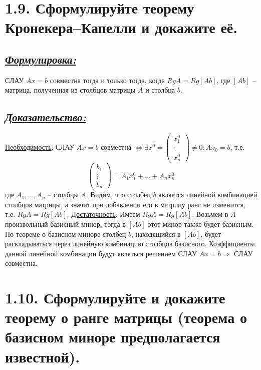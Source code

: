 \documentclass{article}
\begin{document}
\section*{\LARGE 1.9. Сформулируйте теорему Кронекера–Капелли и докажите её. }
\subsection*{\Large \underline{\textit{Формулировка: }}}
СЛАУ $Ax = b$ совместна тогда и только тогда, когда $RgA = Rg[Ab]$, где $[Ab]$ -- матрица, полученная из столбцов матрицы $A$ и столбца $b$. 

\subsection*{\Large \underline{\textit{Доказательство: }}}
\underline{Необходимость}:
\newline СЛАУ $Ax = b$ совместна $\Leftrightarrow \exists x^0 = \begin{pmatrix} x_1^0 \\ \vdots \\ x_n^0 \end{pmatrix} \ne 0 : Ax_0 = b$, т.е. 
$$
\begin{pmatrix} b_1 \\ \vdots \\ b_n \end{pmatrix} = 
A_1x_1^0 + ... + A_nx_n^0 $$
где $A_1, ..., A_n$ -- столбцы $A$.
Видим, что столбец $b$ является линейной комбинацией столбцов матрицы, а значит при добавлении его в матрицу ранг не изменится, т.е. $RgA = Rg[Ab]$.
\underline{Достаточность}:
\newline Имеем $RgA = Rg[Ab]$. Возьмем в $A$ произвольный базисный минор, тогда в $[Ab]$ этот минор также будет базисным. По теореме о базисном миноре столбец $b$, находящийся в $[Ab]$, будет раскладываться через линейную комбинацию столбцов базисного. Коэффициенты данной линейной комбинации будут являться решением СЛАУ $Ax = b \Rightarrow $ СЛАУ совместна.

\section*{\LARGE 1.10. Сформулируйте и докажите теорему о ранге матрицы (теорема о базисном миноре предполагается известной).}
\end{document}
